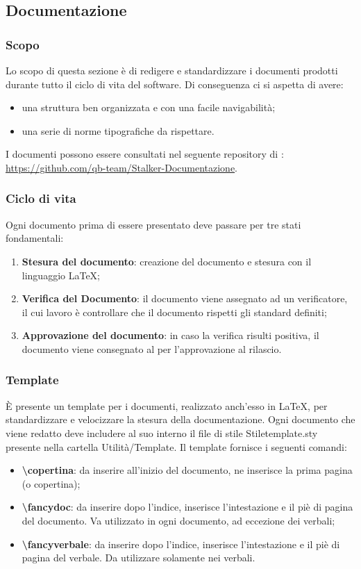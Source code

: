 \subsection{Documentazione}
\subsubsection{Scopo}
Lo scopo di questa sezione è di redigere e standardizzare i documenti prodotti durante tutto il ciclo di vita del software. 
Di conseguenza ci si aspetta di avere:
\begin{itemize}
\item una struttura ben organizzata e con una facile navigabilità;
\item una serie di norme tipografiche da rispettare.
\end{itemize}
I documenti possono essere consultati nel seguente repository di : \url{https://github.com/qb-team/Stalker-Documentazione}.

\subsubsection{Ciclo di vita}
Ogni documento prima di essere presentato deve passare per tre stati fondamentali:
\begin{enumerate}
\item \textbf{Stesura del documento}: creazione del documento e stesura con il linguaggio \LaTeX;
\item \textbf{Verifica del Documento}: il documento viene assegnato ad un verificatore, il cui lavoro è controllare che il documento rispetti gli standard definiti;
\item \textbf{Approvazione del documento}: in caso la verifica risulti positiva, il documento viene consegnato al \Responsabile{} per l'approvazione al rilascio.
\end{enumerate}

\subsubsection{Template}
È presente un template per i documenti, realizzato anch'esso in \LaTeX{}, per standardizzare e velocizzare la stesura della documentazione.
Ogni documento che viene redatto deve includere al suo interno il file di stile Stiletemplate.sty presente nella cartella Utilità/Template.
Il template fornisce i seguenti comandi:
\begin{itemize}
\item \textbf{\textbackslash copertina{}}: da inserire all'inizio del documento, ne inserisce la prima pagina (o copertina);
\item \textbf{\textbackslash fancydoc{}}: da inserire dopo l'indice, inserisce l'intestazione e il piè di pagina del documento. Va utilizzato in ogni documento, ad eccezione dei verbali;
\item \textbf{\textbackslash fancyverbale{}}: da inserire dopo l'indice, inserisce l'intestazione e il piè di pagina del verbale. Da utilizzare solamente nei verbali.
\end{itemize}

